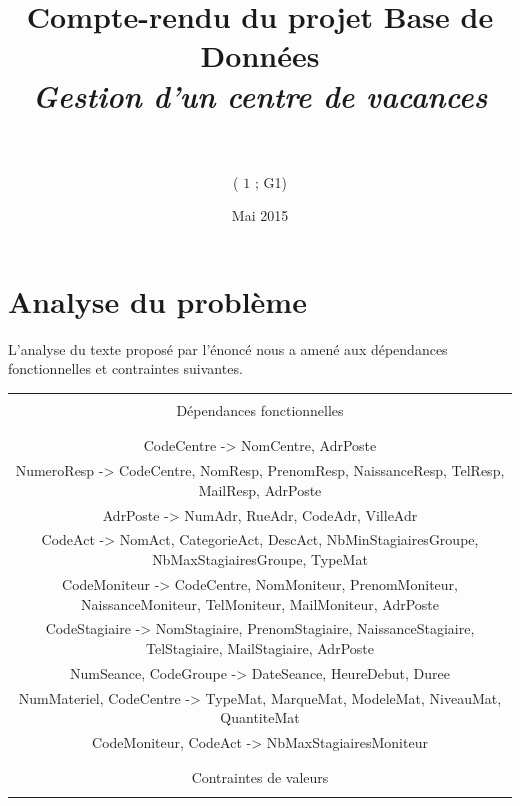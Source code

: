 \documentclass[10pt]{article}
\title{Compte-rendu du projet Base de Données\\ \emph{Gestion d'un centre de vacances}}
\author{\bsc{Garcia Maxime - Ghorreshi Omid}\\ \bsc{Havet Corentin - Portelenelle Brice} \\(\bsc{Teide} $1$ ; \bsc{TD} G1)}
\date{Mai 2015}
\begin{document}
\maketitle

\tableofcontents

\newpage
\section{Analyse du problème}

L'analyse du texte proposé par l'énoncé nous a amené aux dépendances fonctionnelles et contraintes suivantes.\\

\begin{small}
\begin{tabular}{|c|}

\hline
\\Dépendances fonctionnelles\\ \\
\hline

\\CodeCentre -> NomCentre, AdrPoste\\

NumeroResp -> CodeCentre, NomResp, PrenomResp, NaissanceResp, TelResp, MailResp, AdrPoste\\

AdrPoste -> NumAdr, RueAdr, CodeAdr, VilleAdr\\

CodeAct -> NomAct, CategorieAct, DescAct, NbMinStagiairesGroupe, NbMaxStagiairesGroupe, TypeMat\\

CodeMoniteur -> CodeCentre, NomMoniteur, PrenomMoniteur, NaissanceMoniteur, TelMoniteur, MailMoniteur, AdrPoste\\

CodeStagiaire -> NomStagiaire, PrenomStagiaire, NaissanceStagiaire, TelStagiaire, MailStagiaire, AdrPoste\\

NumSeance, CodeGroupe -> DateSeance, HeureDebut, Duree\\

NumMateriel, CodeCentre -> TypeMat, MarqueMat, ModeleMat, NiveauMat, QuantiteMat\\

CodeMoniteur, CodeAct -> NbMaxStagiairesMoniteur\\ \\

\hline
\\Contraintes de valeurs\\ \\
\hline


\end{tabular}
\end{small}
\end{document}
